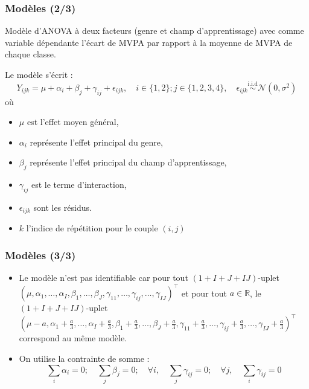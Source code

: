 \documentclass{beamer}
\begin{document}
		\begin{frame}
			\frametitle{Modèles (2/3)} 
			Modèle d'ANOVA à deux facteurs (genre et champ d'apprentissage) avec comme variable dépendante l'écart de MVPA par rapport à la moyenne de MVPA de chaque classe.
			
			Le modèle s'écrit :
			\begin{equation}
				Y_{ijk} = \mu + \alpha_i + \beta_j + \gamma_{ij} + \epsilon_{ijk}, \quad i \in \{1,2\}; j\in \{1,2,3,4\},\quad \epsilon_{ijk} \overset{\text{i.i.d}}{\sim} \mathcal{N}(0, \sigma^2) 
			\end{equation}
			où
			\begin{itemize}
				\item $\mu$ est l'effet moyen général,
				\item $\alpha_i$ représente l'effet principal du genre,
				\item $\beta_j$ représente l'effet principal du champ d'apprentissage,
				\item $\gamma_{ij}$ est le terme d'interaction,
				\item $\epsilon_{ijk}$ sont les résidus.
				\item $k$ l'indice de répétition pour le couple $(i,j)$
			\end{itemize}
		\end{frame}
		\begin{frame}
			\frametitle{Modèles (3/3)} 
			\begin{itemize}
				\item Le modèle n'est pas identifiable car pour tout $(1+I+J+IJ)$-uplet $(\mu, \alpha_1, \ldots, \alpha_I, \beta_1, \ldots, \beta_J, \gamma_{11}, \ldots, \gamma_{ij}, \ldots, \gamma_{IJ})^\top$ et pour tout $a \in \mathbb{R}$, le $(1+I+J+IJ)$-uplet $(\mu-a, \alpha_1+\frac{a}{3}, \ldots, \alpha_I+\frac{a}{3}, \beta_1+\frac{a}{3}, \ldots, \beta_J+\frac{a}{3}, \gamma_{11}+\frac{a}{3}, \ldots, \gamma_{ij}+\frac{a}{3}, \ldots, \gamma_{IJ}+\frac{a}{3})^\top$ correspond au même modèle.
				\vfill
				\item On utilise la contrainte de somme :
				\begin{equation*}
					\sum_{i} \alpha_i = 0; \quad \sum_{j} \beta_j = 0; \quad \forall i, \quad \sum_{j} \gamma_{ij} = 0; \quad \forall j, \quad \sum_{i} \gamma_{ij} = 0
				\end{equation*}
			\end{itemize}
		\end{frame}
		
		
\end{document}
